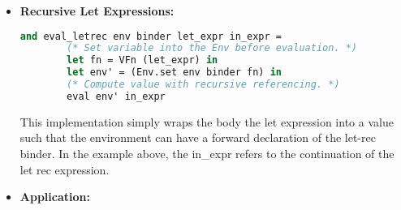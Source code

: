 \documentclass{l4proj}
\begin{document}
\begin{itemize}
    


    \item \textbf{Recursive Let Expressions:}
    
    \begin{lstlisting}[language=Caml, caption=The Pyfunc Interpreter let rec rule.]
    and eval_letrec env binder let_expr in_expr =
        (* Set variable into the Env before evaluation. *)
        let fn = VFn (let_expr) in
        let env' = (Env.set env binder fn) in
        (* Compute value with recursive referencing. *)
        eval env' in_expr
    \end{lstlisting}
    This implementation simply wraps the body the let expression into a value such that the environment can have a forward declaration of the let-rec binder.
    In the example above, the in\_expr refers to the continuation of the let rec expression.    

    \item \textbf{Application:}


\end{itemize}
\end{document}
